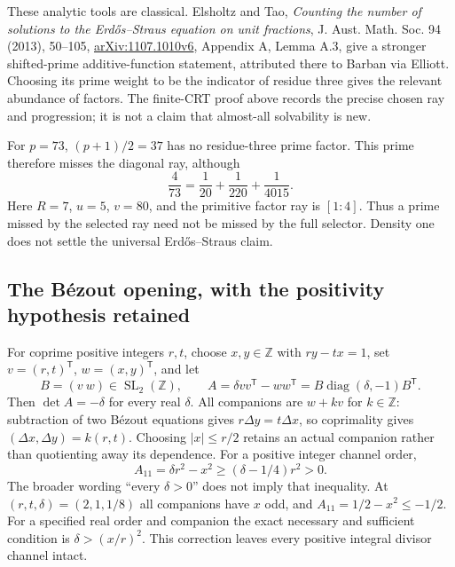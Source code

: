 These analytic tools are classical. Elsholtz and Tao,
\emph{Counting the number of solutions to the Erd\H{o}s--Straus equation on
unit fractions}, J. Aust. Math. Soc. 94 (2013), 50--105,
\href{https://arxiv.org/abs/1107.1010v6}{arXiv:1107.1010v6}, Appendix A,
Lemma A.3, give a stronger shifted-prime additive-function statement,
attributed there to Barban via Elliott. Choosing its prime weight to be
the indicator of residue three gives the relevant abundance of factors.
The finite-CRT proof above records the precise chosen ray and progression;
it is not a claim that almost-all solvability is new.

For $p=73$, $(p+1)/2=37$ has no residue-three prime factor. This prime
therefore misses the diagonal ray, although
\[
 \frac4{73}=\frac1{20}+\frac1{220}+\frac1{4015}.
\]
Here $R=7$, $u=5$, $v=80$, and the primitive factor ray is $[1:4]$.
Thus a prime missed by the selected ray need not be missed by the full
selector. Density one does not settle the universal Erd\H{o}s--Straus claim.

\subsection{The B\'ezout opening, with the positivity hypothesis retained}

For coprime positive integers $r,t$, choose $x,y\in\mathbb Z$ with
$ry-tx=1$, set $v=(r,t)^{\mathsf T}$, $w=(x,y)^{\mathsf T}$, and let
\[
 B=(v\ w)\in\operatorname{SL}_2(\mathbb Z),\qquad
 A=\delta vv^{\mathsf T}-ww^{\mathsf T}
 =B\operatorname{diag}(\delta,-1)B^{\mathsf T}.
\]
Then $\det A=-\delta$ for every real $\delta$. All companions are
$w+kv$ for $k\in\mathbb Z$: subtraction of two B\'ezout equations gives
$r\Delta y=t\Delta x$, so coprimality gives $(\Delta x,\Delta y)=k(r,t)$.
Choosing $|x|\le r/2$ retains an actual companion rather than quotienting
away its dependence. For a positive integer channel order,
\[
 A_{11}=\delta r^2-x^2\ge(\delta-1/4)r^2>0.
\]
The broader wording ``every $\delta>0$'' does not imply that inequality.
At $(r,t,\delta)=(2,1,1/8)$ all companions have $x$ odd, and
$A_{11}=1/2-x^2\le-1/2$. For a specified real order and companion the
exact necessary and sufficient condition is $\delta>(x/r)^2$.
This correction leaves every positive integral divisor channel intact.

